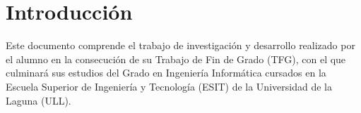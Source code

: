 %
%

\chapter*{Introducción}

Este documento comprende el trabajo de investigación y desarrollo realizado por el alumno en la consecución de su Trabajo de Fin de Grado (TFG), con el que culminará sus estudios del Grado en Ingeniería Informática cursados en la Escuela Superior de Ingeniería y Tecnología (ESIT) de la Universidad de la Laguna (ULL).
